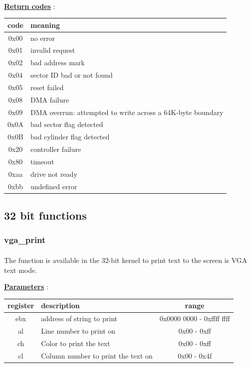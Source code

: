 \documentclass[12pt,letterpaper]{article}
\begin{document}
\paragraph{}
\textbf{\underline{Return codes}} :
\begin{center}
\begin{tabularx}{0.9\textwidth}{ |c|X| }
    \hline
    code & meaning \\
    \hline
    \hline
    0x00 & no error \\
    \hline
    0x01 & invalid request \\
    \hline
    0x02 & bad address mark \\
    \hline
    0x04 & sector ID bad or not found \\
    \hline
    0x05 & reset failed \\
    \hline
    0x08 & DMA failure \\
    \hline
    0x09 & DMA overrun: attempted to write across a 64K-byte boundary \\
    \hline
    0x0A & bad sector flag detected \\
    \hline
    0x0B & bad cylinder flag detected \\
    \hline
    0x20 & controller failure \\
    \hline
    0x80 & timeout \\
    \hline
    0xaa & drive not ready \\
    \hline
    0xbb & undefined error \\
    \hline
\end{tabularx}
\end{center}

\newpage
\subsection{32 bit functions}

\subsubsection{vga\_print}
\paragraph{}
The function is available in the 32-bit kernel to print text to the screen is VGA text mode.


\textbf{\underline{Parameters}} :
\begin{center}
\begin{tabularx}{0.9\textwidth}{ |c|Y|c| }
    \hline
    register & description & range \\
    \hline
    \hline
    ebx & address of string to print & 0x0000 0000 - 0xffff ffff \\
    \hline
    al & Line number to print on & 0x00 - 0xff \\ 
    \hline
    ch & Color to print the text & 0x00 - 0xff \\
    \hline
    cl & Column number to print the text on & 0x00 - 0x4f \\
    \hline
\end{tabularx}
\label{table:vga_print_inputs}
\end{center}
\end{document}
